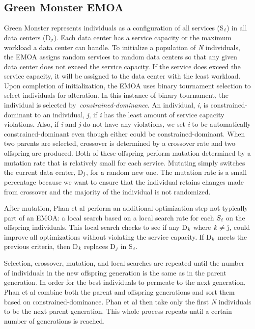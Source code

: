 \documentclass{sig-alternate}
\begin{document}
\subsection{Green Monster EMOA}
\label{sec:GMEMOA}

Green Monster represents individuals as a configuration of all services (S$_{\text{\emph{i}}}$) in all data centers (D$_{\text{\emph{j}}}$). Each data center has a service capacity
or the maximum workload a data center can handle. To initialize a population of \emph{N} individuals, the EMOA assigns random services to random data centers so that any given data center does not exceed the service capacity. If the service does exceed the service capacity, it will be assigned to the data center with the least workload. Upon completion of initialization, the EMOA uses binary tournament selection to select individuals for alteration. In this instance of binary tournament, the individual is selected by~\emph{constrained-dominance}. An individual, \emph{i}, is constrained-dominant to an individual, \emph{j}, if \emph{i} has the least amount of service capacity violations. Also, if \emph{i} and \emph{j} do not have any violations, we set \emph{i} to be automatically constrained-dominant even though either could be constrained-dominant. When two parents are selected, crossover is determined by a crossover rate and two offspring are produced. Both of these offspring perform mutation determined by a mutation rate that is relatively small for each service. Mutating simply switches the current data center, D$_{\text{\emph{j}}}$, for a random new one. The mutation rate is a small percentage because we want to ensure that the individual retains changes made from crossover and the majority of the individual is not randomized. 

After mutation, Phan et al perform an additional optimization step not typically part of an EMOA: a local search based on a local search rate for each $S_{\text{\emph{i}}}$ on the offspring individuals. This local search checks to see if any D$_{\text{\emph{k}}}$ where ${\text{\emph{k} ${\neq}$ j}}$, could improve all optimizations without violating the service capacity. If D$_{\text{\emph{k}}}$ meets the previous criteria, then D$_{\text{\emph{k}}}$ replaces D$_{\text{\emph{j}}}$ in S$_{\text{\emph{i}}}$. 

Selection, crossover, mutation, and local searches are repeated until the number of individuals in the new offspring generation is the same as in the parent generation. In order for the best individuals to permeate to the next generation, Phan et al combine both the parent and offspring generations and sort them based on constrained-dominance. Phan et al then take only the first \emph{N} individuals to be the next parent generation. This whole process repeats until a certain number of generations is reached. 
\end{document}
